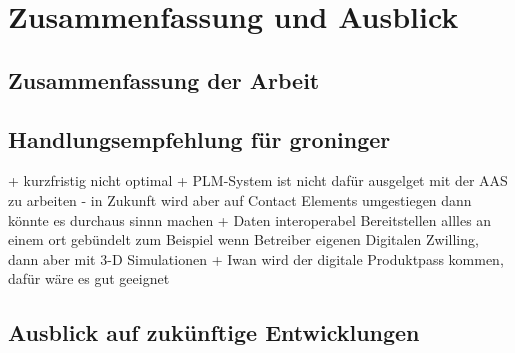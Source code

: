 \newpage
\section{Zusammenfassung und Ausblick}
\label{sec:Zusammenfassung}
\subsection{Zusammenfassung der Arbeit}
\subsection{Handlungsempfehlung für groninger}
+ kurzfristig nicht optimal
+ PLM-System ist nicht dafür ausgelget mit der AAS zu arbeiten - in Zukunft wird aber auf Contact Elements umgestiegen dann könnte es durchaus sinnn machen
+ Daten interoperabel Bereitstellen allles an einem ort gebündelt zum Beispiel wenn Betreiber eigenen Digitalen Zwilling, dann aber mit 3-D Simulationen
+ Iwan wird der digitale Produktpass kommen, dafür wäre es gut geeignet
\subsection{Ausblick auf zukünftige Entwicklungen}





